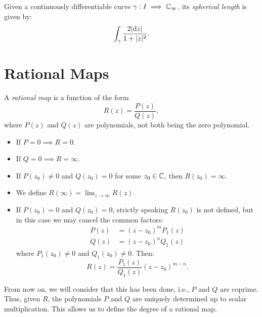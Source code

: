 \begin{remark}
    Given a continuously differentiable curve $\gamma : I \implies \mathbb{C}_\infty$,
    its \emph{spherical length} is given by:
    \begin{equation*}
        \int_{\gamma} \frac{2|\mathrm{d} z|}{1+|z|^2}.
    \end{equation*}
\end{remark}

\section{Rational Maps}
\label{sec:rational_maps}

\begin{definition}
    A \emph{rational map} is a function of the form
    \begin{equation*}
        R(z) = \frac{P(z)}{Q(z)},
    \end{equation*}
    where $P(z)$ and $Q(z)$ are polynomials, not both being the zero polynomial.
\end{definition}

\begin{itemize}
    \item If $P = 0 \implies R = 0$.
    \item If $Q = 0 \implies R = \infty$.
    \item If $P(z_0) \neq 0$ and $Q(z_0) = 0$ for some $z_0 \in \mathbb{C}$, then
    $R(z_0) = \infty$.
    \item We define $R(\infty) = \lim_{z \to \infty} R(z)$.
    \item If $P(z_0) = 0$ and $Q(z_0) = 0$, strictly speaking $R(z_0)$ is not
    defined, but in this case we may cancel the common factors:
    \begin{align*}
        P(z) &= (z-z_0)^m P_1(z) \\
        Q(z) &= (z-z_0)^n Q_1(z)
    \end{align*}
    where $P_1(z_0) \neq 0$ and $Q_1(z_0) \neq 0$. Then:
    \begin{equation*}
        R(z) = \frac{P_1(z)}{Q_1(z)} (z-z_0)^{m-n}.
    \end{equation*}
\end{itemize}

From now on, we will consider that this has been done, i.e., $P$ and $Q$ are
coprime. Thus, given $R$, the polynomials $P$ and $Q$ are uniquely determined up
to scalar multiplication. This allows us to define the degree of a rational map.

